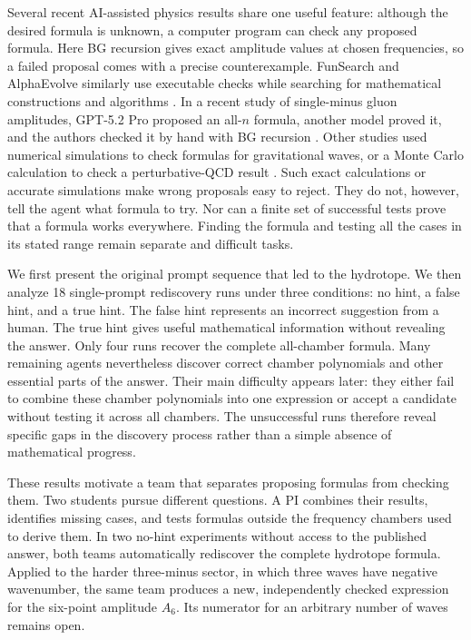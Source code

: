 \documentclass{article}
\begin{document}
Several recent AI-assisted physics results share one useful feature: although
the desired formula is unknown, a computer program can check any proposed
formula. Here BG recursion gives exact amplitude values at chosen frequencies,
so a failed proposal comes with a precise counterexample. FunSearch and
AlphaEvolve similarly use executable checks while searching for mathematical
constructions and algorithms \citep{funsearch,alphaevolve}. In a recent study
of single-minus gluon amplitudes, GPT-5.2 Pro proposed an all-$n$ formula,
another model proved it, and the authors checked it by hand with BG recursion
\citep{guevara2026singleminus}. Other studies used numerical simulations to
check formulas for gravitational waves, or a Monte Carlo calculation to check
a perturbative-QCD result
\citep{Islam2026InterpretableSurrogates,Islam2026UnifiedRemnant,
Schwartz2026CParameter}. Such exact calculations or accurate simulations make
wrong proposals easy to reject. They do not, however, tell the agent what
formula to try. Nor can a finite set of successful tests prove that a formula
works everywhere. Finding the formula and testing all the cases in its stated
range remain separate and difficult tasks.

We first present the original prompt sequence that led to the hydrotope. We
then analyze 18 single-prompt rediscovery runs under three conditions: no hint,
a false hint, and a true hint. The false hint represents an incorrect
suggestion from a human. The true hint gives useful mathematical information
without revealing the answer. Only four runs recover the
complete all-chamber formula. Many remaining agents nevertheless discover correct chamber
polynomials and other essential parts of the answer. Their main difficulty
appears later: they either fail to combine these chamber polynomials into one
expression or accept a candidate without testing it across all chambers. The unsuccessful runs
therefore reveal specific gaps in the discovery process rather than a simple
absence of mathematical progress.

These results motivate a team that separates proposing formulas from checking
them. Two students pursue different questions. A PI combines
their results, identifies missing cases, and tests formulas outside the
frequency chambers used to derive them. In two no-hint experiments without access to the published
answer, both teams automatically rediscover the complete hydrotope formula.
Applied to the harder three-minus sector, in which three waves have
negative wavenumber, the same
team produces a new, independently checked expression for the six-point
amplitude $A_6$. Its numerator for an arbitrary number of waves remains open.
\end{document}
